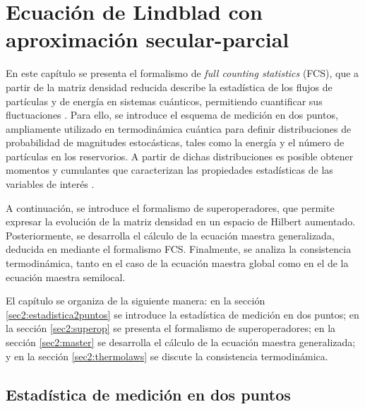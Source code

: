 
\chapter{Ecuación de Lindblad con aproximación secular-parcial}

En este capítulo se presenta el formalismo de \textit{full counting statistics} (FCS), que a partir de la matriz densidad reducida describe la estadística de los flujos de partículas y de energía en sistemas cuánticos, permitiendo cuantificar sus fluctuaciones \cite{esposito2009nonequilibrium,landi2024current}. Para ello, se introduce el esquema de medición en dos puntos, ampliamente utilizado en termodinámica cuántica para definir distribuciones de probabilidad de magnitudes estocásticas, tales como la energía y el número de partículas en los reservorios. A partir de dichas distribuciones es posible obtener momentos y cumulantes que caracterizan las propiedades estadísticas de las variables de interés \cite{esposito2009nonequilibrium}.

A continuación, se introduce el formalismo de superoperadores, que permite expresar la evolución de la matriz densidad en un espacio de Hilbert aumentado. Posteriormente, se desarrolla el cálculo de la ecuación maestra generalizada, deducida en \cite{potts2021thermodynamically} mediante el formalismo FCS. Finalmente, se analiza la consistencia termodinámica, tanto en el caso de la ecuación maestra global como en el de la ecuación maestra semilocal.

El capítulo se organiza de la siguiente manera: en la sección \ref{sec2:estadistica2puntos} se introduce la estadística de medición en dos puntos; en la sección \ref{sec2:superop} se presenta el formalismo de superoperadores; en la sección \ref{sec2:master} se desarrolla el cálculo de la ecuación maestra generalizada; y en la sección \ref{sec2:thermolaws} se discute la consistencia termodinámica.

\label{sec2:estadistica}

\section{Estadística de medición en dos puntos}

